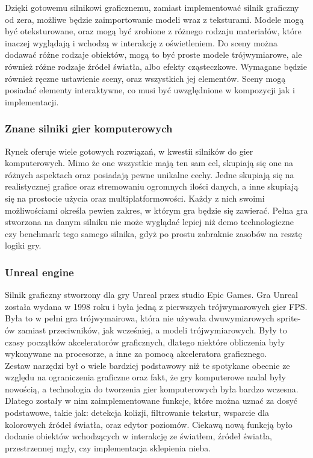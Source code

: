 \documentclass{article} %
\begin{document}
        Dzięki gotowemu silnikowi graficznemu, zamiast implementować silnik graficzny od zera, możliwe będzie zaimportowanie modeli wraz z teksturami. Modele mogą być oteksturowane, oraz mogą być zrobione z różnego rodzaju materiałów, które inaczej wyglądają i wchodzą w interakcję z oświetleniem. Do sceny można dodawać różne rodzaje obiektów, mogą to być proste modele trójwymiarowe, ale również różne rodzaje źródeł światła, albo efekty cząsteczkowe. Wymagane będzie również ręczne ustawienie sceny, oraz wszystkich jej elementów. Sceny mogą posiadać elementy interaktywne, co musi być uwzględnione w kompozycji jak i implementacji.
        \\
                      
        \subsubsection{Znane silniki gier komputerowych}
        Rynek oferuje wiele gotowych rozwiązań, w kwestii silników do gier komputerowych. Mimo że one wszystkie mają ten sam cel, skupiają się one na różnych aspektach oraz posiadają pewne unikalne cechy. Jedne skupiają się na realistycznej grafice oraz stremowaniu ogromnych ilości danych, a inne skupiają się na prostocie użycia oraz multiplatformowości. Każdy z nich swoimi możliwościami określa pewien zakres, w którym gra będzie się zawierać. Pełna gra stworzona na danym silniku nie może wyglądać lepiej niż demo technologiczne czy benchmark tego samego silnika, gdyż po prostu zabraknie zasobów na resztę logiki gry.
        \\
        
        \subsubsection*{Unreal engine}
        Silnik graficzny stworzony dla gry Unreal przez studio Epic Games. Gra Unreal została wydana w 1998 roku i była jedną z pierwszych trójwymarowych gier FPS. Była to w pełni gra trójwymairowa, która nie używała dwuwymiarowych sprite-ów zamiast przeciwników, jak wcześniej, a modeli trójwymiarowych. Były to czasy początków akceleratorów graficznych, dlatego niektóre obliczenia były wykonywane na procesorze, a inne za pomocą akceleratora graficznego.
        \\
        
        Zestaw narzędzi był o wiele bardziej podstawowy niż te spotykane obecnie ze względu na ograniczenia graficzne oraz fakt, że gry komputerowe nadal były nowością, a technologia do tworzenia gier komputerowych była bardzo wczesna. Dlatego zostały w nim zaimplementowane funkcje, które można uznać za dosyć podstawowe, takie jak: detekcja kolizji, filtrowanie tekstur, wsparcie dla kolorowych źródeł światła, oraz edytor poziomów. Ciekawą nową funkcją było dodanie obiektów wchodzących w interakcję ze światłem, źródeł światła, przestrzennej mgły, czy implementacja sklepienia nieba.
        \\
        
\end{document}
